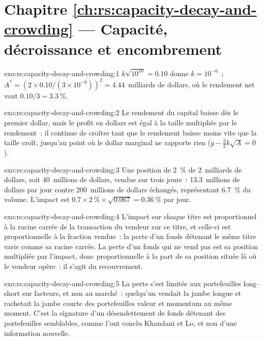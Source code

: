 \section*{Chapitre \ref{ch:rs:capacity-decay-and-crowding} --- Capacité, décroissance et encombrement}

\begin{solution}{exo:rs:capacity-decay-and-crowding:1}
$k\sqrt{10^{10}} = 0.10$ donne $k = 10^{-6}$~; $A^* = (2 \times 0.10/(3 \times 10^{-6}))^2 = 4.44$~milliards de dollars, où le rendement net vaut $0.10/3 = 3.3~\%$.
\end{solution}

\begin{solution}{exo:rs:capacity-decay-and-crowding:2}
Le rendement du capital baisse dès le premier dollar, mais le profit en dollars est égal à la taille multipliée par le rendement~: il continue de croître tant que le rendement baisse moins vite que la taille
croît, jusqu'au point où le dollar marginal ne rapporte rien ($g - \frac32 k\sqrt A = 0$).
\end{solution}

\begin{solution}{exo:rs:capacity-decay-and-crowding:3}
Une position de 2~\% de 2~milliards de dollars, soit 40~millions de dollars, vendue sur trois jours~: 13.3~millions de dollars par jour contre 200~millions de dollars échangés, représentant 6.7~\% du volume. L'impact est
$0.7 \times 2~\% \times \sqrt{0.067} = 0.36~\%$ par jour.
\end{solution}

\begin{solution}{exo:rs:capacity-decay-and-crowding:4}
L'impact sur chaque titre est proportionnel à la racine carrée de la transaction du vendeur sur ce titre, et celle-ci est proportionnelle à la fraction vendue~: la perte d'un fonds détenant
le même titre varie comme sa racine carrée. La perte d'un fonds qui ne vend pas est sa position multipliée par l'impact, donc proportionnelle à la part de sa position située là où le vendeur
opère~: il s'agit du recouvrement.
\end{solution}

\begin{solution}{exo:rs:capacity-decay-and-crowding:5}
La perte s'est limitée aux portefeuilles long--short sur facteurs, et non au marché~: quelqu'un vendait la jambe longue et rachetait la jambe courte des portefeuilles valeur et momentum
au même moment. C'est la signature d'un désendettement de fonds détenant des portefeuilles semblables, comme l'ont conclu Khandani et Lo, et non d'une information nouvelle.
\end{solution}

